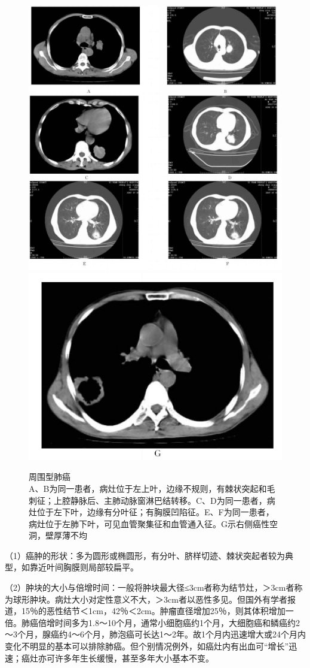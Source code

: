 \begin{figure}[!htbp]
 \centering
 \includegraphics[width=.7\textwidth,height=\textheight,keepaspectratio]{./images/Image00217.jpg}
 \includegraphics[width=.7\textwidth,height=\textheight,keepaspectratio]{./images/Image00218.jpg}
 \captionsetup{justification=centering}
 \caption{周围型肺癌\\{\small A、B为同一患者，病灶位于左上叶，边缘不规则，有棘状突起和毛刺征；上腔静脉后、主肺动脉窗淋巴结转移。C、D为同一患者，病灶位于左下叶，边缘有分叶征；有胸膜凹陷征。E、F为同一患者，病灶位于左肺下叶，可见血管聚集征和血管通入征。G示右侧癌性空洞，壁厚薄不均}}
 \label{fig9-29}
  \end{figure} 

（1）癌肿的形状：多为圆形或椭圆形，有分叶、脐样切迹、棘状突起者较为典型，如靠近叶间胸膜则局部较扁平。

（2）肿块的大小与倍增时间：一般将肿块最大径≤3cm者称为结节灶，＞3cm者称为球形肿块。病灶大小对定性意义不大，＞3cm者以恶性多见。但国外有学者报道，15％的恶性结节＜1cm，42％＜2cm。肿瘤直径增加25％，则其体积增加一倍。肺癌倍增时间多为1.8～10个月，通常小细胞癌约1个月，大细胞癌和鳞癌约2～3个月，腺癌约4～6个月，肺泡癌可长达1～2年。故1个月内迅速增大或24个月内变化不明显的基本可以排除肺癌。但个别情况例外，如癌灶内有出血可“增长”迅速；癌灶亦可许多年生长缓慢，甚至多年大小基本不变。

